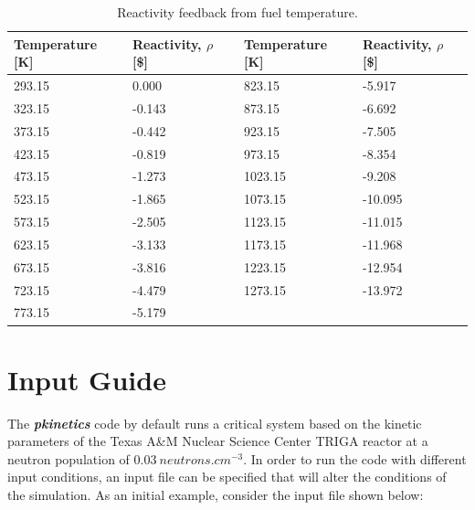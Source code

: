 \documentclass[11pt,letterpaper,titlepage]{article}
\begin{document}
\begin{table}[H]
\centering
\caption{Reactivity feedback from fuel temperature.}
\label{table:reac}
\begin{tabular}{|l|l|ll}
\hline
\textbf{Temperature {[}K{]}} & \textbf{Reactivity, $\rho$ [\$]} & \multicolumn{1}{l|}{\textbf{Temperature {[}K{]}}} & \multicolumn{1}{l|}{\textbf{Reactivity, $\rho$ [\$]}} \\ \hline
293.15             & 0.000        & \multicolumn{1}{l|}{823.15}             & \multicolumn{1}{l|}{-5.917}       \\ \hline
323.15             & -0.143       & \multicolumn{1}{l|}{873.15}             & \multicolumn{1}{l|}{-6.692}       \\ \hline
373.15             & -0.442       & \multicolumn{1}{l|}{923.15}             & \multicolumn{1}{l|}{-7.505}       \\ \hline
423.15             & -0.819       & \multicolumn{1}{l|}{973.15}             & \multicolumn{1}{l|}{-8.354}       \\ \hline
473.15             & -1.273       & \multicolumn{1}{l|}{1023.15}            & \multicolumn{1}{l|}{-9.208}       \\ \hline
523.15             & -1.865       & \multicolumn{1}{l|}{1073.15}            & \multicolumn{1}{l|}{-10.095}      \\ \hline
573.15             & -2.505       & \multicolumn{1}{l|}{1123.15}            & \multicolumn{1}{l|}{-11.015}      \\ \hline
623.15             & -3.133       & \multicolumn{1}{l|}{1173.15}            & \multicolumn{1}{l|}{-11.968}      \\ \hline
673.15             & -3.816       & \multicolumn{1}{l|}{1223.15}            & \multicolumn{1}{l|}{-12.954}      \\ \hline
723.15             & -4.479       & \multicolumn{1}{l|}{1273.15}            & \multicolumn{1}{l|}{-13.972}      \\ \hline
773.15             & -5.179       &                                         &                                   \\ \cline{1-2}
\end{tabular}
\end{table}
\newpage
{}
\section{Input Guide}
The \textbf{\textit{pkinetics}} code by default runs a critical system based on the kinetic parameters of the Texas A\&M Nuclear Science Center TRIGA reactor at a neutron population of $0.03 \ neutrons.cm^{-3}$. In order to run the code with different input conditions, an input file can be specified that will alter the conditions of the simulation. As an initial example, consider the input file shown below:
\end{document}
